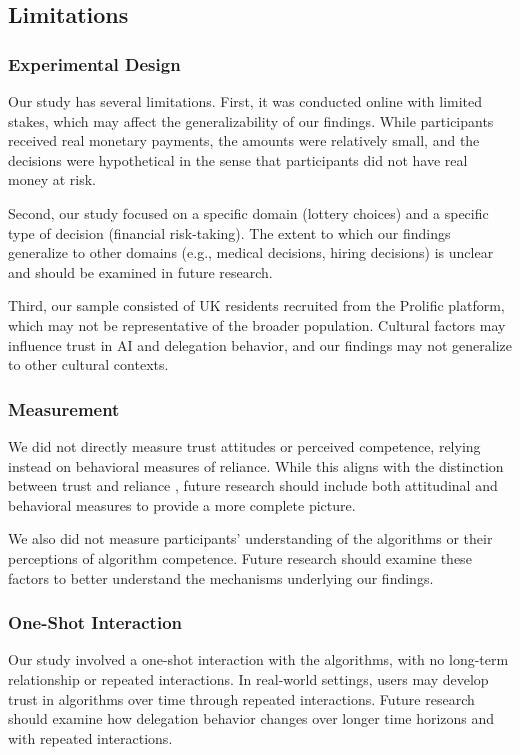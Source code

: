 \subsection{Limitations}

\subsubsection{Experimental Design}

Our study has several limitations. First, it was conducted online with limited stakes, which may affect the generalizability of our findings. While participants received real monetary payments, the amounts were relatively small, and the decisions were hypothetical in the sense that participants did not have real money at risk.

Second, our study focused on a specific domain (lottery choices) and a specific type of decision (financial risk-taking). The extent to which our findings generalize to other domains (e.g., medical decisions, hiring decisions) is unclear and should be examined in future research.

Third, our sample consisted of UK residents recruited from the Prolific platform, which may not be representative of the broader population. Cultural factors may influence trust in AI and delegation behavior, and our findings may not generalize to other cultural contexts.

\subsubsection{Measurement}

We did not directly measure trust attitudes or perceived competence, relying instead on behavioral measures of reliance. While this aligns with the distinction between trust and reliance \citep{lee2004}, future research should include both attitudinal and behavioral measures to provide a more complete picture.

We also did not measure participants' understanding of the algorithms or their perceptions of algorithm competence. Future research should examine these factors to better understand the mechanisms underlying our findings.

\subsubsection{One-Shot Interaction}

Our study involved a one-shot interaction with the algorithms, with no long-term relationship or repeated interactions. In real-world settings, users may develop trust in algorithms over time through repeated interactions. Future research should examine how delegation behavior changes over longer time horizons and with repeated interactions.

